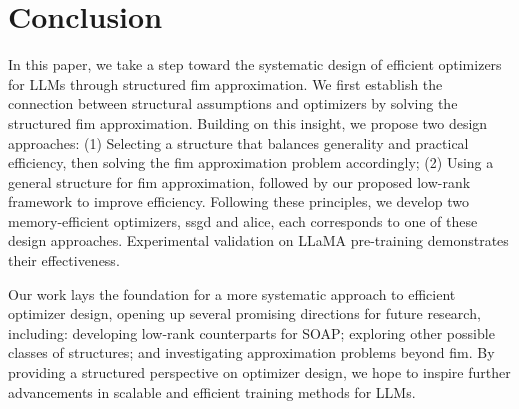 \section{Conclusion}
\label{sec: conclusion}
In this paper, we take a step toward the systematic design of efficient optimizers for LLMs through structured \gls{fim} approximation. We first establish the connection between structural assumptions and optimizers by solving the structured \gls{fim} approximation. Building on this insight, we propose two design approaches:
(1) Selecting a structure that balances generality and practical efficiency, then solving the \gls{fim} approximation problem accordingly;  
(2) Using a general structure for \gls{fim} approximation, followed by our proposed low-rank framework to improve efficiency.  
Following these principles, we develop two memory-efficient optimizers, \gls{ssgd} and \gls{alice}, each corresponds to one of these design approaches. Experimental validation on LLaMA pre-training demonstrates their effectiveness.  

Our work lays the foundation for a more systematic approach to efficient optimizer design, opening up several promising directions for future research, including: developing low-rank counterparts for SOAP; exploring other possible classes of structures; and investigating approximation problems beyond \gls{fim}.  
By providing a structured perspective on optimizer design, we hope to inspire further advancements in scalable and efficient training methods for LLMs.